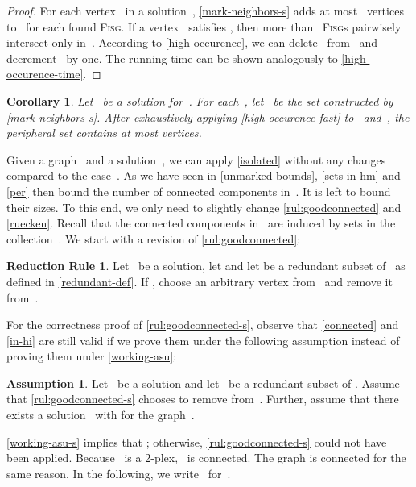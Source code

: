 \documentclass[12pt, a4paper, abstracton]{scrreprt}
\newcommand{\FISG}{\textsc{Fisg}}
\newcounter{theorem}
\newtheorem{korollar}{Corollary}[chapter]
\theoremstyle{definition}
\newtheorem{rul}{Reduction Rule}[chapter]
\newtheorem{asu}{Assumption}[chapter]
\theoremstyle{remark}
\begin{document}
\begin{proof}
  For each vertex~ in a solution~, \autoref{mark-neighbors-s} adds at most~ vertices to~ for each found \FISG{}. If a vertex~ satisfies , then more than~ \FISG{}s pairwisely intersect only in~. According to \autoref{high-occurence}, we can delete~ from~ and decrement~ by one. The running time can be shown analogously to \autoref{high-occurence-time}.
\end{proof}

\begin{korollar}\label{size-M-s}
  Let~ be a solution for~. For each~, let~ be the
  set constructed by \autoref{mark-neighbors-s}. After exhaustively
  applying \autoref{high-occurence-fast} to~ and~, the peripheral set
   contains at most  vertices.
\end{korollar}

\noindent Given a graph~ and a solution~, we can apply
\autoref{isolated} without any changes compared to the case~. As
we have seen in \autoref{unmarked-bounds}, \autoref{sets-in-hm} and
\autoref{per} then bound the number of connected components
in~. It is left to bound their sizes.  To this end, we only need
to slightly change \autoref{rul:goodconnected} and
\autoref{ruecken}. Recall that the connected components in~ are
induced by sets in the collection~. We start with a revision of
\autoref{rul:goodconnected}:
 
\begin{rul}\label{rul:goodconnected-s}
  Let~ be a solution, let  and let  be a
  redundant subset of~ as defined in \autoref{redundant-def}. If , choose an arbitrary vertex
  from~ and remove it from~.
\end{rul}

\noindent For the correctness proof of
\autoref{rul:goodconnected-s}, observe that \autoref{connected} and \autoref{in-hi} are still valid if we prove them under the following assumption instead of proving them under \autoref{working-asu}:

\begin{asu}\label{working-asu-s}
  Let~ be a solution and let ~be a redundant subset of . Assume that \autoref{rul:goodconnected-s} chooses to remove  from~.  Further, assume that there exists a solution~ with  for the graph~.
\end{asu}

\noindent \autoref{working-asu-s} implies that ; otherwise, \autoref{rul:goodconnected-s} could not have been applied. Because~ is a 2-plex, ~is connected. The graph  is connected for the same reason.  In the following, we write ~for~. 
\end{document}
